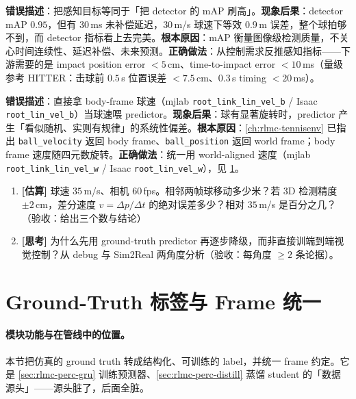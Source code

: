 \begin{pitfall}
\textbf{错误描述}：把感知目标等同于「把 detector 的 mAP 刷高」。\textbf{现象后果}：detector mAP $0.95$，但有 $30$\,ms 未补偿延迟，$30$\,m/s 球速下等效 $0.9$\,m 误差，整个球拍够不到，而 detector 指标看上去完美。\textbf{根本原因}：mAP 衡量图像级检测质量，不关心时间连续性、延迟补偿、未来预测。\textbf{正确做法}：从控制需求反推感知指标——下游需要的是 impact position error $<5$\,cm、time-to-impact error $<10$\,ms（量级参考 HITTER：击球前 $0.5$\,s 位置误差 $<7.5$\,cm、$0.3$\,s timing $<20$\,ms\cite{tennis_hitter2025}）。
\end{pitfall}

\begin{pitfall}
\textbf{错误描述}：直接拿 body-frame 球速（mjlab \verb|root_link_lin_vel_b| / Isaac \verb|root_lin_vel_b|）当球速喂 predictor。\textbf{现象后果}：球有显著旋转时，predictor 产生「看似随机、实则有规律」的系统性偏差。\textbf{根本原因}：\cref{ch:rlmc-tennisenv} 已指出 \verb|ball_velocity| 返回 body frame、\verb|ball_position| 返回 world frame；body frame 速度随四元数旋转。\textbf{正确做法}：统一用 world-aligned 速度（mjlab \verb|root_link_lin_vel_w| / Isaac \verb|root_lin_vel_w|），见 \cref{sec:rlmc-perc-frame}。
\end{pitfall}

\begin{practice}[本节动手任务]
\begin{enumerate}
  \item \textbf{[估算]} 球速 $35$\,m/s、相机 $60$\,fps。相邻两帧球移动多少米？若 3D 检测精度 $\pm 2$\,cm，差分速度 $v=\Delta p/\Delta t$ 的绝对误差多少？相对 $35$\,m/s 是百分之几？（验收：给出三个数与结论）
  \item \textbf{[思考]} 为什么先用 ground-truth predictor 再逐步降级，而非直接训端到端视觉控制？从 debug 与 Sim2Real 两角度分析（验收：每角度 $\ge 2$ 条论据）。
\end{enumerate}
\end{practice}

\section{Ground-Truth 标签与 Frame 统一}
\label{sec:rlmc-perc-frame}

\paragraph{模块功能与在管线中的位置。}本节把仿真的 ground truth 转成结构化、可训练的 label，并统一 frame 约定。它是 \cref{sec:rlmc-perc-gru} 训练预测器、\cref{sec:rlmc-perc-distill} 蒸馏 student 的「数据源头」——源头脏了，后面全脏。

